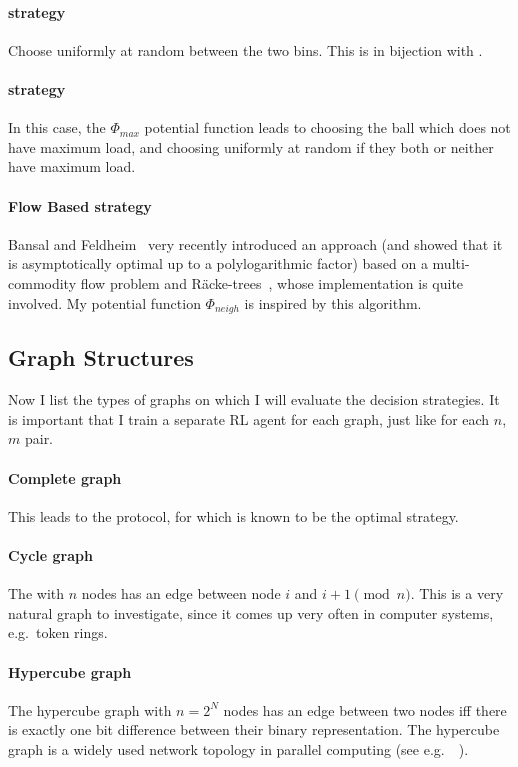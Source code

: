 \paragraph{\Random strategy} Choose uniformly at random between the two bins. This is in bijection with \OneChoice.


\paragraph{\LocalRewardOptimiser strategy} In this case, the $\Phi_{max}$ potential function leads to choosing the ball which does not have maximum load, and choosing uniformly at random if they both or neither have maximum load.


\paragraph{Flow Based strategy}

Bansal and Feldheim~\cite{bansal2021twochoicegraphical} very recently introduced an approach (and showed that it is asymptotically optimal up to a polylogarithmic factor) based on a multi-commodity flow problem and R\"{a}cke-trees~\cite{racke2008racketree}, whose implementation is quite involved. My potential function $\Phi_{neigh}$ is inspired by this algorithm.


\subsection{Graph Structures}


Now I list the types of graphs on which I will evaluate the decision strategies. It is important that I train a separate RL agent for each graph, just like for each $n$, $m$ pair.


\paragraph{Complete graph} This leads to the \TwoChoice protocol, for which \Greedy is known to be the optimal strategy.


\paragraph{Cycle graph} The \CycleGraph with $n$ nodes has an edge between node $i$ and $i+1 \pmod{n}$. This is a very natural graph to investigate, since it comes up very often in computer systems, e.g.\ token rings.


\paragraph{Hypercube graph} The hypercube graph with $n=2^N$ nodes has an edge between two nodes iff there is exactly one bit difference between their binary representation. The hypercube graph is a widely used network topology in parallel computing (see e.g.\ ~\cite{ayalvadi2005hypercubenetwork}).



